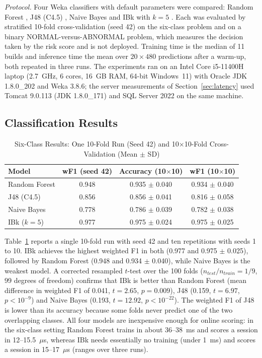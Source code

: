 \textit{Protocol.} Four Weka classifiers with default parameters were compared: Random Forest \cite{breiman2001rf},
J48 (C4.5) \cite{quinlan1993c45}, Naive Bayes \cite{john1995nb} and IBk with $k = 5$ \cite{aha1991ibl}. Each was
evaluated by stratified 10-fold cross-validation \cite{kohavi1995cv} (seed 42) on the six-class problem and on a binary
NORMAL-versus-ABNORMAL problem, which measures the decision taken by the risk score and is not deployed. Training time
is the median of 11 builds and inference time the mean over $20 \times 480$ predictions after a warm-up, both repeated
in three runs. The experiments ran on an Intel Core i5-11400H laptop (2.7~GHz, 6 cores, 16~GB RAM, 64-bit Windows~11)
with Oracle JDK 1.8.0\_202 and Weka 3.8.6; the server measurements of Section~\ref{sec:latency} used Tomcat 9.0.113 (JDK
1.8.0\_171) and SQL Server 2022 on the same machine.

\subsection{Classification Results}

\begin{table}[t]
\centering
\small
\caption{Six-Class Results: One 10-Fold Run (Seed 42) and 10$\times$10-Fold Cross-Validation (Mean $\pm$ SD)}
\label{tab:ml}
\begin{tabular}{l c c c}
\toprule
Model & wF1 (seed 42) & Accuracy (10$\times$10) & wF1 (10$\times$10) \\
\midrule
Random Forest & 0.948 & 0.935 $\pm$ 0.040 & 0.934 $\pm$ 0.040 \\
J48 (C4.5)    & 0.856 & 0.856 $\pm$ 0.041 & 0.816 $\pm$ 0.058 \\
Naive Bayes   & 0.778 & 0.786 $\pm$ 0.039 & 0.782 $\pm$ 0.038 \\
IBk ($k=5$)   & 0.977 & 0.975 $\pm$ 0.024 & 0.975 $\pm$ 0.025 \\
\bottomrule
\end{tabular}
\end{table}

Table~\ref{tab:ml} reports a single 10-fold run with seed 42 and ten repetitions with seeds 1 to 10. IBk achieves the
highest weighted F1 in both (0.977 and 0.975 $\pm$ 0.025), followed by Random Forest (0.948 and 0.934 $\pm$ 0.040),
while Naive Bayes is the weakest model. A corrected resampled $t$-test \cite{nadeau2003inference} over the 100 folds
($n_{test}/n_{train}=1/9$, 99 degrees of freedom) confirms that IBk is better than Random Forest (mean difference in
weighted F1 of 0.041, $t=2.65$, $p=0.009$), J48 (0.159, $t=6.97$, $p<10^{-9}$) and Naive Bayes (0.193, $t=12.92$,
$p<10^{-22}$). The weighted F1 of J48 is lower than its accuracy because some folds never predict one of the two
overlapping classes. All four models are inexpensive enough for online scoring: in the six-class setting Random Forest
trains in about 36--38~ms and scores a session in 12--15.5~$\mu$s, whereas IBk needs essentially no training (under
1~ms) and scores a session in 15--17~$\mu$s (ranges over three runs).

